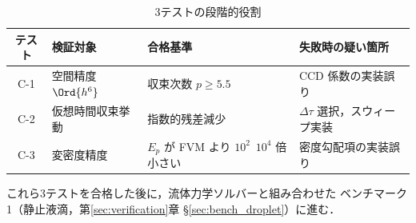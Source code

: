 \begin{table}[h]
\centering
\caption{3テストの段階的役割}
\label{tab:three_tests_role}
\renewcommand{\arraystretch}{1.3}
\begin{tabular}{clll}
\hline
テスト & 検証対象 & 合格基準 & 失敗時の疑い箇所 \\
\hline
C-1 & 空間精度 $\Ord{h^6}$ & 収束次数 $p \ge 5.5$ & CCD 係数の実装誤り \\
C-2 & 仮想時間収束挙動 & 指数的残差減少 & $\Delta\tau$ 選択，スウィープ実装 \\
C-3 & 変密度精度 & $E_p$ が FVM より $10^2$~$10^4$ 倍小さい & 密度勾配項の実装誤り \\
\hline
\end{tabular}
\end{table}

これら3テストを合格した後に，流体力学ソルバーと組み合わせた
ベンチマーク1（静止液滴，第\ref{sec:verification}章 §\ref{sec:bench_droplet}）に進む．
